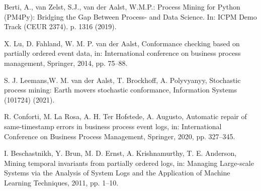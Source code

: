 \documentclass[a4paper,11pt,twoside]{pads-thesis}
\begin{document}
\begin{thebibliography}{5}
Berti, A., van Zelst, S.J., van der Aalst, W.M.P.: Process Mining for Python (PM4Py): Bridging the Gap Between Process- and Data Science. In: ICPM Demo Track (CEUR 2374). p. 1316 (2019).

X. Lu, D. Fahland, W. M. P. van der Aalst, Conformance checking based on partially ordered event data, in: International conference on business process management, Springer, 2014, pp. 75–88.

S. J. Leemans,W. M. van der Aalst, T. Brockhoff, A. Polyvyanyy, Stochastic process mining: Earth movers stochastic conformance, Information Systems (101724) (2021).

R. Conforti, M. La Rosa, A. H. Ter Hofstede, A. Augusto, Automatic repair of same-timestamp errors in business
process event logs, in: International Conference on Business Process Management, Springer, 2020, pp. 327–345.

I. Beschastnikh, Y. Brun, M. D. Ernst, A. Krishnamurthy, T. E. Anderson, Mining temporal invariants from partially ordered logs, in: Managing Large-scale Systems via the Analysis of System Logs and the Application of Machine Learning Techniques, 2011, pp. 1–10.




\end{thebibliography}





%
\end{document}
